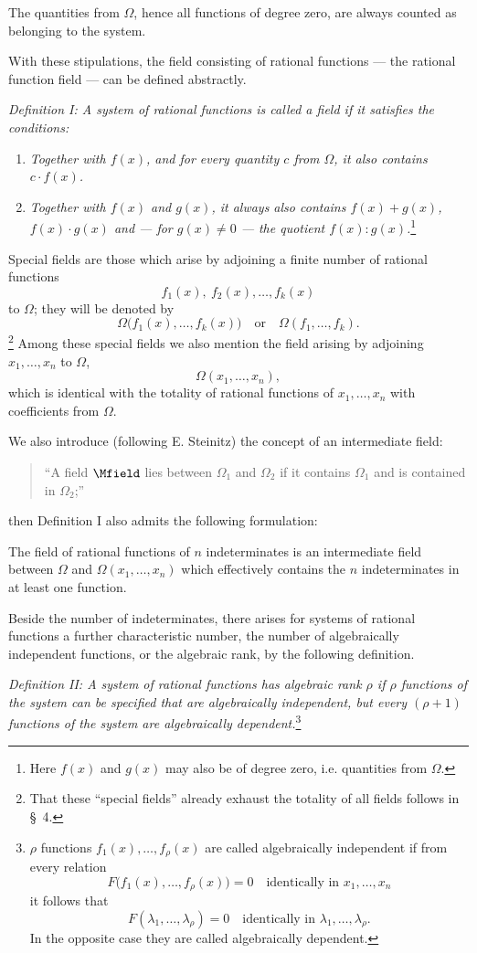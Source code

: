 \documentclass[11pt]{article}
\begin{document}
The quantities from $\Omega$, hence all functions of degree zero, are always counted as belonging to the system.

With these stipulations, the field consisting of rational functions --- the rational function field --- can be defined abstractly.

\emph{Definition I: A system of rational functions is called a field if it satisfies the conditions:}
\begin{enumerate}
\item \emph{Together with $f(x)$, and for every quantity $c$ from $\Omega$, it also contains $c\cdot f(x)$.}
\item \emph{Together with $f(x)$ and $g(x)$, it always also contains $f(x)+g(x)$, $f(x)\cdot g(x)$ and --- for $g(x)\ne0$ --- the quotient $f(x):g(x)$.}\footnote{Here $f(x)$ and $g(x)$ may also be of degree zero, i.e. quantities from $\Omega$.}
\end{enumerate}
Special fields are those which arise by adjoining a finite number of rational functions
\[
  f_1(x),\ f_2(x),\ldots, f_k(x)
\]
to $\Omega$; they will be denoted by
\[
  \Omega\bigl(f_1(x),\ldots,f_k(x)\bigr)
  \quad\text{or}\quad
  \Omega(f_1,\ldots,f_k).
\]
\footnote{That these ``special fields'' already exhaust the totality of all fields follows in \S\ 4.}
Among these special fields we also mention the field arising by adjoining $x_1,\ldots,x_n$ to $\Omega$,
\[
  \Omega(x_1,\ldots,x_n),
\]
which is identical with the totality of rational functions of $x_1,\ldots,x_n$ with coefficients from $\Omega$.

We also introduce (following E. Steinitz) the concept of an intermediate field:
\begin{quote}
``A field $\Mfield$ lies between $\Omega_1$ and $\Omega_2$ if it contains $\Omega_1$ and is contained in $\Omega_2$;''
\end{quote}
then Definition I also admits the following formulation:

The field of rational functions of $n$ indeterminates is an intermediate field between $\Omega$ and $\Omega(x_1,\ldots,x_n)$ which effectively contains the $n$ indeterminates in at least one function.

Beside the number of indeterminates, there arises for systems of rational functions a further characteristic number, the number of algebraically independent functions, or the algebraic rank, by the following definition.

\emph{Definition II: A system of rational functions has algebraic rank $\rho$ if $\rho$ functions of the system can be specified that are algebraically independent, but every $(\rho+1)$ functions of the system are algebraically dependent.}\footnote{$\rho$ functions $f_1(x),\ldots,f_\rho(x)$ are called algebraically independent if from every relation
\[
F\bigl(f_1(x),\ldots,f_\rho(x)\bigr)=0\quad\text{identically in }x_1,\ldots,x_n
\]
it follows that
\[
F(\lambda_1,\ldots,\lambda_\rho)=0\quad\text{identically in }\lambda_1,\ldots,\lambda_\rho.
\]
In the opposite case they are called algebraically dependent.}
\end{document}
